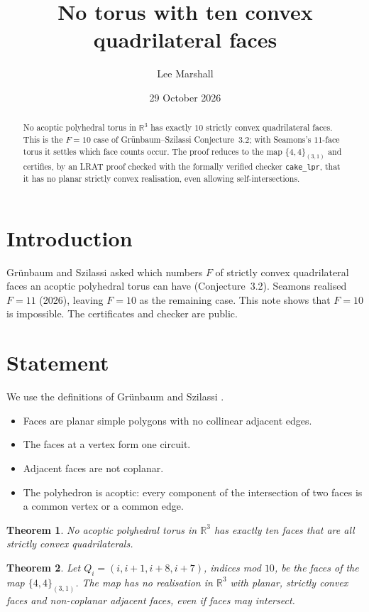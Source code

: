 \documentclass[11pt]{article}
\title{No torus with ten convex quadrilateral faces}
\author{Lee Marshall}
\date{29 October 2026}
\newtheorem{theorem}{Theorem}
\begin{document}
\maketitle

\begin{abstract}
No acoptic polyhedral torus in $\mathbb{R}^3$ has exactly $10$ strictly convex quadrilateral faces. This is the
$F=10$ case of Gr\"unbaum--Szilassi Conjecture~3.2; with Seamons's $11$-face torus it settles which face counts
occur. The proof reduces to the map $\{4,4\}_{(3,1)}$ and certifies, by an LRAT proof checked with the formally
verified checker \texttt{cake\_lpr}, that it has no planar strictly convex realisation, even allowing
self-intersections.
\end{abstract}

\section{Introduction}
Gr\"unbaum and Szilassi \cite{GS} asked which numbers $F$ of strictly convex quadrilateral faces an acoptic
polyhedral torus can have (Conjecture~3.2). Seamons realised $F=11$ (2026), leaving $F=10$ as the remaining case.
This note shows that $F=10$ is impossible. The certificates and checker are public.

\section{Statement}
We use the definitions of Gr\"unbaum and Szilassi \cite[p.~21]{GS}.
\begin{itemize}
\item Faces are planar simple polygons with no collinear adjacent edges.
\item The faces at a vertex form one circuit.
\item Adjacent faces are not coplanar.
\item The polyhedron is acoptic: every component of the intersection of two faces is a common vertex or a common
  edge.
\end{itemize}

\begin{theorem}\label{thm:main}
No acoptic polyhedral torus in $\mathbb{R}^3$ has exactly ten faces that are all strictly convex quadrilaterals.
\end{theorem}

\begin{theorem}\label{thm:strong}
Let $Q_i=(i,i+1,i+8,i+7)$, indices mod $10$, be the faces of the map $\{4,4\}_{(3,1)}$. The map has no
realisation in $\mathbb{R}^3$ with planar, strictly convex faces and non-coplanar adjacent faces, even if faces
may intersect.
\end{theorem}
\end{document}
